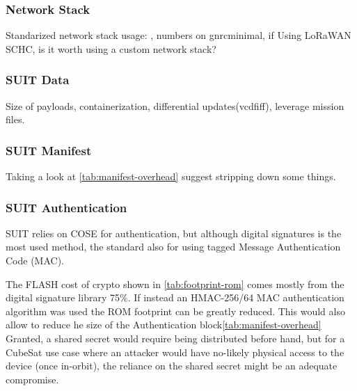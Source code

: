 
\subsubsection{Network Stack}

Standarized network stack usage: \cite{wachter20206locan01}, numbers on gnrcminimal,
if Using LoRaWAN SCHC\cite{rfc8724}, is it worth using a custom network stack?

\subsubsection{SUIT Data}

Size of payloads, containerization, differential updates(vcdfiff), leverage mission files.

\subsubsection{SUIT Manifest}

Taking a look at \ref*{tab:manifest-overhead} suggest stripping down some things.

\subsubsection{SUIT Authentication}

SUIT relies on COSE for authentication, but although digital signatures is the
most used method, the standard also for using tagged Message Authentication Code
(MAC).

The FLASH cost of crypto shown in \ref{tab:footprint-rom} comes mostly from the
digital signature library 75\%\cite{zandberg2019secure}. If instead an HMAC-256/64
MAC authentication algorithm was used the ROM footprint can be greatly reduced.
This would also allow to reduce he size of the Authentication block\ref*{tab:manifest-overhead}
Granted, a shared secret would require being distributed before hand, but for a
CubeSat use case where an attacker would have no-likely physical access to the
device (once in-orbit), the reliance on the shared secret might be an adequate
compromise.
